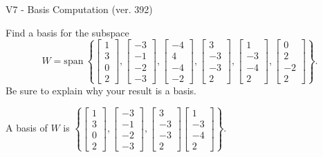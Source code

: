 \begin{exercise}
  \begin{exerciseTitle}V7 - Basis Computation (ver. 392)\end{exerciseTitle}
  \begin{exerciseStatement}
    Find a basis for the subspace 
\[W=\mathrm{span}\ \left\{\left[\begin{array}{r}
1 \\
3 \\
0 \\
2
\end{array}\right] , \left[\begin{array}{r}
-3 \\
-1 \\
-2 \\
-3
\end{array}\right] , \left[\begin{array}{r}
-4 \\
4 \\
-4 \\
-2
\end{array}\right] , \left[\begin{array}{r}
3 \\
-3 \\
-3 \\
2
\end{array}\right] , \left[\begin{array}{r}
1 \\
-3 \\
-4 \\
2
\end{array}\right] , \left[\begin{array}{r}
0 \\
2 \\
-2 \\
2
\end{array}\right]\right\}.\]
 Be sure to explain why your result is a basis.


  \end{exerciseStatement}
  \begin{exerciseAnswer}
   A basis of \(W\) is  \(\left\{\left[\begin{array}{r}
1 \\
3 \\
0 \\
2
\end{array}\right] , \left[\begin{array}{r}
-3 \\
-1 \\
-2 \\
-3
\end{array}\right] , \left[\begin{array}{r}
3 \\
-3 \\
-3 \\
2
\end{array}\right] \left[\begin{array}{r}
1 \\
-3 \\
-4 \\
2
\end{array}\right]\right\}\).
  


  \end{exerciseAnswer}
\end{exercise}